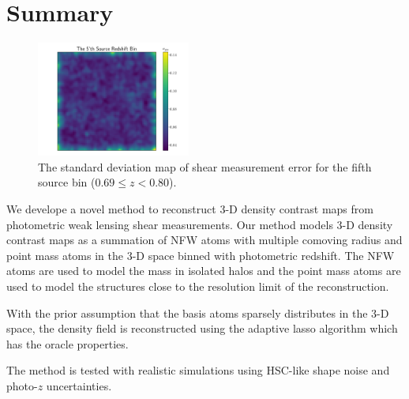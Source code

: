 \documentclass[twocolumn]{aastex62}
\begin{document}
\section{Summary}
\label{sec:Sum}

\begin{figure}[!ht]
 \centering
 \includegraphics[width=0.45\textwidth]{noise_std_map_pix.pdf}
 \caption{The standard deviation map of shear measurement error for the fifth source bin ($0.69 \leq z < 0.80 $).}
\end{figure}




We develope a novel method to reconstruct $3$-D density contrast maps from photometric weak lensing shear measurements.
Our method models $3$-D density contrast maps as a summation of NFW atoms with multiple comoving radius and point mass atoms
in the $3$-D space binned with photometric redshift. The NFW atoms are used to model the mass in isolated halos and the 
point mass atoms are used to model the structures close to the resolution limit of the reconstruction. 

With the prior assumption that the basis atoms sparsely distributes in the $3$-D space, the density field is reconstructed 
using the adaptive lasso algorithm \citep{AdaLASSO-Zou2006} which has the oracle properties. 


The method is tested with realistic simulations using HSC-like shape noise and photo-$z$ uncertainties.
\end{document}
